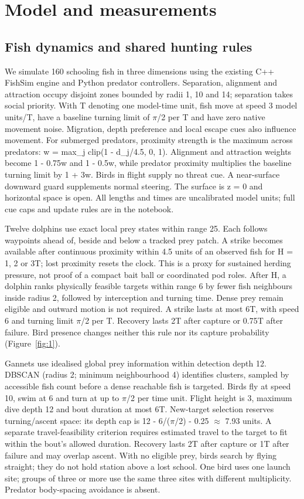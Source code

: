 \documentclass[10pt,a4paper,twocolumn]{article}
\begin{document}
\section{Model and measurements}
\subsection{Fish dynamics and shared hunting rules}
We simulate 160 schooling fish in three dimensions using the existing C++ FishSim engine and Python predator controllers. Separation, alignment and attraction \citep{couzin2002} occupy disjoint zones bounded by radii 1, 10 and 14; separation takes social priority. With T denoting one model-time unit, fish move at speed 3 model units/T, have a baseline turning limit of \ensuremath{\pi}/2 per T and have zero native movement noise. Migration, depth preference and local escape cues also influence movement. For submerged predators, proximity strength is the maximum across predators: w = max\_j clip(1 - d\_j/4.5, 0, 1). Alignment and attraction weights become 1 - 0.75w and 1 - 0.5w, while predator proximity multiplies the baseline turning limit by 1 + 3w. Birds in flight supply no threat cue. A near-surface downward guard supplements normal steering. The surface is z = 0 and horizontal space is open. All lengths and times are uncalibrated model units; full cue caps and update rules are in the notebook.

Twelve dolphins use exact local prey states within range 25. Each follows waypoints ahead of, beside and below a tracked prey patch. A strike becomes available after continuous proximity within 4.5 units of an observed fish for H = 1, 2 or 3T; lost proximity resets the clock. This is a proxy for sustained herding pressure, not proof of a compact bait ball or coordinated pod roles. After H, a dolphin ranks physically feasible targets within range 6 by fewer fish neighbours inside radius 2, followed by interception and turning time. Dense prey remain eligible and outward motion is not required. A strike lasts at most 6T, with speed 6 and turning limit \ensuremath{\pi}/2 per T. Recovery lasts 2T after capture or 0.75T after failure. Bird presence changes neither this rule nor its capture probability (Figure~\ref{fig:1}).

Gannets use idealised global prey information within detection depth 12. DBSCAN (radius 2; minimum neighbourhood 4) identifies clusters, sampled by accessible fish count before a dense reachable fish is targeted. Birds fly at speed 10, swim at 6 and turn at up to \ensuremath{\pi}/2 per time unit. Flight height is 3, maximum dive depth 12 and bout duration at most 6T. New-target selection reserves turning/ascent space: its depth cap is 12 - 6/(\ensuremath{\pi}/2) - 0.25 \ensuremath{\approx} 7.93 units. A separate travel-feasibility criterion requires estimated travel to the target to fit within the bout's allowed duration. Recovery lasts 2T after capture or 1T after failure and may overlap ascent. With no eligible prey, birds search by flying straight; they do not hold station above a lost school. One bird uses one launch site; groups of three or more use the same three sites with different multiplicity. Predator body-spacing avoidance is absent.
\end{document}

